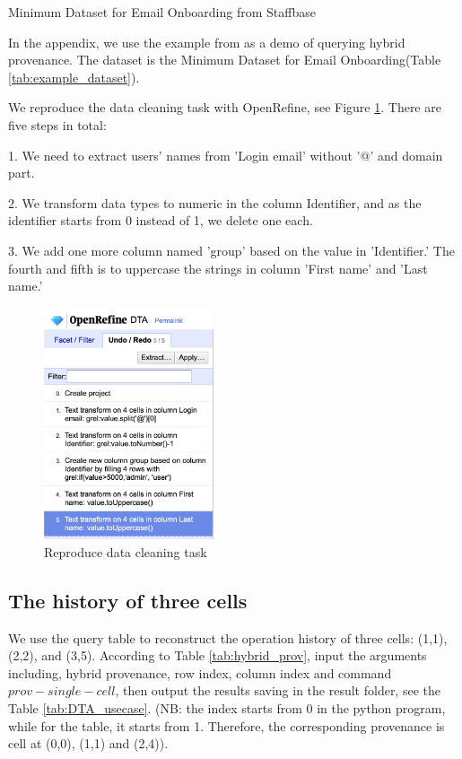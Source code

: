 
\begin{table}[h]
    \centering
    \small
    \caption{Minimum Dataset for Email Onboarding from Staffbase}
    \label{tab:example_dataset}
\end{table}



In the appendix, we use the example from \cite{nunez2020first} as a demo of querying hybrid provenance.  The dataset is the Minimum Dataset for Email Onboarding(Table \ref{tab:example_dataset}).

We reproduce the data cleaning task with OpenRefine, see Figure \ref{fig:reproduce}. There are five steps in total:

1. We need to extract users' names from 'Login email' without '@' and domain part.

2. We transform data types to numeric in the column Identifier, and as the identifier starts from 0 instead of 1, we delete one each.

3. We add one more column named 'group' based on the value in 'Identifier.' The fourth and fifth is to uppercase the strings in column 'First name' and 'Last name.' 

\begin{figure}
\centering
\includegraphics[width=5cm]{Figure/DTA_demo.png}
\caption{Reproduce data cleaning task}
\label{fig:reproduce}
\end{figure}


\subsection{\textbf{The history of three cells}}

We use the query table to reconstruct the operation history of three cells: (1,1), (2,2), and (3,5). According to Table \ref{tab:hybrid_prov}, input the arguments including, hybrid provenance, row index, column index and command $prov-single-cell$, then output the results saving in the result folder, see the Table \ref{tab:DTA_usecase}. (NB: the index starts from 0 in the python program, while for the table, it starts from 1. Therefore, the corresponding provenance is cell at (0,0), (1,1) and (2,4)). 


